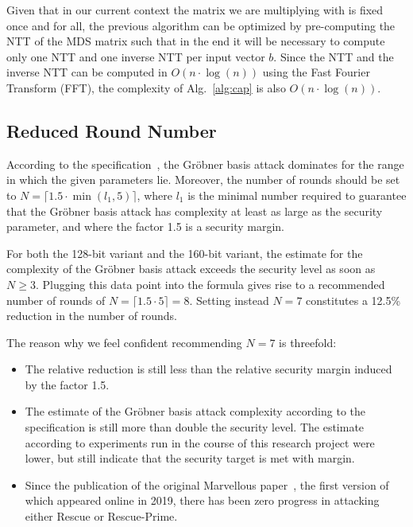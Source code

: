 \documentclass[a4paper]{article}
\begin{document}
Given that in our current context the matrix we are multiplying with is fixed once and for all, the previous algorithm can be optimized by pre-computing the NTT of the MDS matrix such that in the end it will be necessary to compute only one NTT and one inverse NTT per input vector $b$. Since the NTT and the inverse NTT can be computed in $O(n \cdot\log(n))$ using the Fast Fourier Transform (FFT), the complexity of Alg.~\ref{alg:cap} is also $O(n \cdot\log(n))$.

\subsection{Reduced Round Number}
\label{section:round-number}

According to the specification~\cite{cryptoeprint:2020/1143}, the Gröbner basis attack dominates for the range in which the given parameters lie. Moreover, the number of rounds should be set to $N = \lceil 1.5 \cdot \min(l_1, 5)\rceil$, where $l_1$ is the minimal number required to guarantee that the Gröbner basis attack has complexity at least as large as the security parameter, and where the factor 1.5 is a security margin.

For both the 128-bit variant and the 160-bit variant, the estimate for the complexity of the Gröbner basis attack exceeds the security level as soon as $N \geq 3$. Plugging this data point into the formula gives rise to a recommended number of rounds of $N = \lceil 1.5 \cdot 5 \rceil = 8$. Setting instead $N=7$ constitutes a 12.5\% reduction in the number of rounds.

The reason why we feel confident recommending $N=7$ is threefold:
\begin{itemize}
 \item The relative reduction is still less than the relative security margin induced by the factor 1.5.
 \item The estimate of the Gröbner basis attack complexity according to the specification is still more than double the security level. The estimate according to experiments run in the course of this research project were lower, but still indicate that the security target is met with margin.
 \item Since the publication of the original Marvellous paper~\cite{cryptoeprint:2019/426}, the first version of which appeared online in 2019, there has been zero progress in attacking either Rescue or Rescue-Prime.
\end{itemize}
 
\end{document}
